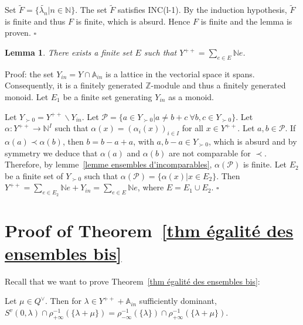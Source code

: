 \documentclass[12pt]{article}
\theoremstyle{plain}
\newtheorem{lemme}[thm]{Lemma}
\theoremstyle{definition}
\newcommand{\A}{\mathbb{A}}
\newcommand{\N}{\mathbb{N}}
\newcommand{\Z}{\mathbb{Z}}
\begin{document}
 Set $\tilde{F}=\{\tilde{\lambda_n}|n\in\N\}$. The set $\tilde{F}$ satisfies INC(l-1). By the induction hypothesis, $\tilde{F}$ is finite and thus $F$ is finite, which is absurd. Hence $F$ is finite and the lemma is proven. $\square$

\begin{lemme}\label{lemme description de Y^{++}}
There exists a finite set $E$ such that $Y^{++}=\sum_{e\in E}\N e$.
\end{lemme}

Proof: the set $Y_{in}=Y\cap\A_{in}$ is a lattice in the vectorial space it spans. Consequently, it is a finitely generated $\Z$-module and thus a finitely generated monoid. Let $E_1$ be a finite set generating $Y_{in}$ as a monoid.

 Let $Y_{\succ 0}=Y^{++}\backslash Y_{in}$. Let $\mathcal{P}=\{a\in Y_{\succ 0}|a\neq b+c\ \forall b,c\in Y_{\succ 0}\}$. Let $\alpha:Y^{++}\rightarrow \N^{I}$ such that 
 $\alpha(x)=(\alpha_i(x))_{i\in I}$ for all $x\in Y^{++}$. Let $a,b\in \mathcal{P}$.
  If $\alpha(a)\prec \alpha(b)$, then $b=b-a+a$, with $a,b-a\in Y_{\succ 0}$, which is absurd and by symmetry we deduce that $\alpha(a)$ and $\alpha(b)$ are not comparable for $\prec$. 
Therefore, by lemme~\ref{lemme ensembles d'incomparables}, $\alpha(\mathcal{P})$ is finite. Let $E_2$ be a finite set of $Y_{\succ 0}$ such that $\alpha(\mathcal{P})=\{\alpha(x)|x\in E_2\}$. Then $Y^{++}=\sum_{e\in E_2}\N e+Y_{in}=\sum_{e\in E}\N e$, where $E=E_1\cup E_2$. $\square$

 

\section{Proof of Theorem~\ref{thm égalité des ensembles bis}}\label{sect proof of final theorem}
Recall that we want to prove Theorem~\ref{thm égalité des ensembles bis}: 

 Let $\mu\in Q^\vee$. Then for $\lambda\in Y^{++}+\A_{in}$ sufficiently dominant, $S^v(0,\lambda)\cap \rho_{+\infty}^{-1}(\{\lambda+\mu\})=\rho_{-\infty}^{-1}(\{\lambda\})\cap\rho_{+\infty}^{-1}(\{\lambda+\mu\})$.
\end{document}
